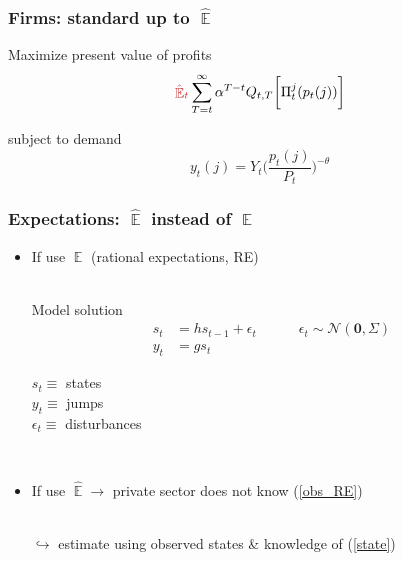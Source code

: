 \documentclass[10pt]{beamer}
\DeclareMathOperator{\E}{\mathbb{E}}
\begin{document}
\begin{frame}
	\frametitle{Firms: standard up to $\hat{\E}$}

Maximize present value of profits
\begin{equation}
\textcolor{brownreddark}{\hat{\E}_t}\sum^{\infty}_{T=t}\alpha^{T-t} Q_{t,T} \bigg[ \Pi^j_t(p_t(j))\bigg]
\label{lifetime_profits}
\end{equation}

subject to demand
\begin{equation}
y_t(j) = Y_t \bigg(\frac{p_t(j)}{P_t}\bigg)^{-\theta}
\end{equation}


\vfill

\hfill \hyperlink{details_HHs_firms}{}

\end{frame}

\begin{frame}
	\frametitle{Expectations: $\hat{\E}$ instead of $\E$}

\begin{itemize}
\item If use $\E$ (rational expectations, RE) \\

\

Model solution 
 \begin{align}
 s_t & = h s_{t-1} + \epsilon_t \quad \quad \quad \epsilon_t \sim \mathcal{N}(\mathbf{0},\Sigma) \label{state} \\
 y_t & = g s_t \label{obs_RE}
 \end{align}


$s_t \equiv $ states \\
$y_t \equiv $ jumps \\
$\epsilon_t \equiv $ disturbances
\

\pause

\

\item If use $\hat{\E} \rightarrow$ private sector does not know (\ref{obs_RE}) \\

\

$\hookrightarrow$ estimate using observed states \& knowledge of (\ref{state})

\end{itemize}



\end{frame}
\end{document}
